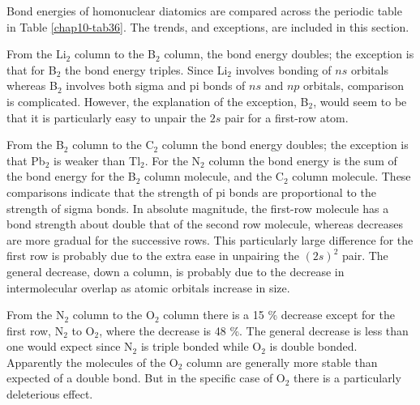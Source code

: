 Bond energies of homonuclear diatomics are compared across the
periodic table in Table \ref{chap10-tab36}. The trends, and
exceptions, are included in this section.

From the Li$_2$ column to the B$_2$ column, the bond energy doubles; the 
exception is that for B$_2$ the bond energy triples.  Since Li$_2$ 
involves bonding of $ns$ orbitals whereas B$_2$ involves both sigma 
and pi bonds of $ns$ and $np$ orbitals, comparison is complicated. However, 
the explanation of the exception, B$_2$, would seem to be that it is 
particularly easy to unpair the $2s$ pair for a first-row atom.
	
From the B$_2$ column to the C$_2$ column the bond energy doubles; 
the exception is that Pb$_2$ is weaker than Tl$_2$.  For the N$_2$ column 
the bond energy is the sum of the bond energy for the B$_2$ 
column molecule, and the C$_2$ column molecule. These comparisons 
indicate that the strength of pi bonds are proportional to 
the strength of sigma bonds.  In absolute magnitude, the 
first-row molecule has a bond strength about double that 
of the second row molecule, whereas decreases are more gradual 
for the successive rows.  This particularly large difference 
for the first row is probably due to the extra ease in 
unpairing the $(2s)^2$ pair.  The general decrease, down a 
column, is probably due to the decrease in intermolecular 
overlap as atomic orbitals increase in size.

From the N$_2$ column to the O$_2$ column there is a 15 \% decrease
except for the first row, N$_2$ to O$_2$, where the decrease is 
48 \%.  The general decrease is less than one would expect 
since N$_2$ is triple bonded while O$_2$ is double bonded. Apparently 
the molecules of the O$_2$ column are generally more stable 
than expected of a double bond.  But in the specific case 
of O$_2$ there is a particularly deleterious effect.

